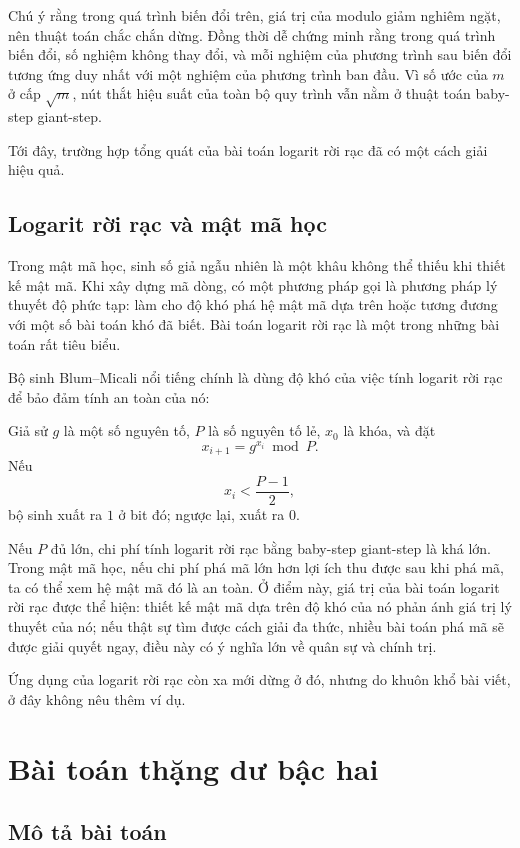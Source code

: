 \documentclass[11pt]{article}
\begin{document}
Chú ý rằng trong quá trình biến đổi trên, giá trị của modulo giảm nghiêm
ngặt, nên thuật toán chắc chắn dừng. Đồng thời dễ chứng minh rằng trong quá
trình biến đổi, số nghiệm không thay đổi, và mỗi nghiệm của phương trình sau
biến đổi tương ứng duy nhất với một nghiệm của phương trình ban đầu. Vì số
ước của $m$ ở cấp $\sqrt m$, nút thắt hiệu suất của toàn bộ quy trình vẫn nằm
ở thuật toán baby-step giant-step.

Tới đây, trường hợp tổng quát của bài toán logarit rời rạc đã có một cách
giải hiệu quả.

\subsection{Logarit rời rạc và mật mã học}

Trong mật mã học, sinh số giả ngẫu nhiên là một khâu không thể thiếu khi thiết
kế mật mã. Khi xây dựng mã dòng, có một phương pháp gọi là phương pháp lý
thuyết độ phức tạp: làm cho độ khó phá hệ mật mã dựa trên hoặc tương đương
với một số bài toán khó đã biết. Bài toán logarit rời rạc là một trong những
bài toán rất tiêu biểu.

Bộ sinh Blum--Micali nổi tiếng chính là dùng độ khó của việc tính logarit rời
rạc để bảo đảm tính an toàn của nó:

Giả sử $g$ là một số nguyên tố, $P$ là số nguyên tố lẻ, $x_0$ là khóa, và đặt
\[
  x_{i+1}=g^{x_i}\bmod P.
\]
Nếu
\[
  x_i<\frac{P-1}{2},
\]
bộ sinh xuất ra $1$ ở bit đó; ngược lại, xuất ra $0$.

Nếu $P$ đủ lớn, chi phí tính logarit rời rạc bằng baby-step giant-step là khá
lớn. Trong mật mã học, nếu chi phí phá mã lớn hơn lợi ích thu được sau khi phá
mã, ta có thể xem hệ mật mã đó là an toàn. Ở điểm này, giá trị của bài toán
logarit rời rạc được thể hiện: thiết kế mật mã dựa trên độ khó của nó phản
ánh giá trị lý thuyết của nó; nếu thật sự tìm được cách giải đa thức, nhiều
bài toán phá mã sẽ được giải quyết ngay, điều này có ý nghĩa lớn về quân sự
và chính trị.

Ứng dụng của logarit rời rạc còn xa mới dừng ở đó, nhưng do khuôn khổ bài
viết, ở đây không nêu thêm ví dụ.

\section{Bài toán thặng dư bậc hai}

\subsection{Mô tả bài toán}
\end{document}
